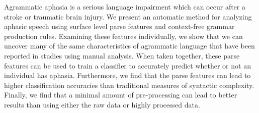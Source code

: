 Agrammatic aphasia is a serious language impairment which can occur after a stroke or traumatic brain injury. We present an automatic method for analyzing aphasic speech using surface level parse features and context-free grammar production rules. Examining these features individually, we show that we can uncover many of the same characteristics of agrammatic language that have been reported in studies using manual analysis. When taken together, these parse features can be used to train a classifier to accurately predict whether or not an individual has aphasia. Furthermore, we find that the parse features can lead to higher classification accuracies than traditional measures of syntactic complexity. Finally, we find that a minimal amount of pre-processing can lead to better results than using either the raw data or highly processed data.
